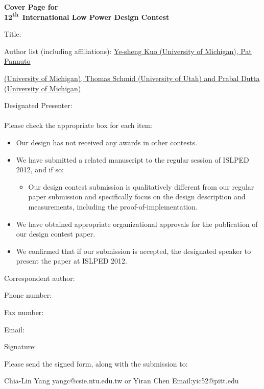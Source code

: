 \documentclass[11pt]{article}
\begin{document}
\begin{center}
\LARGE{\bf Cover Page for \\
12$^{\mbox{\small th}}$ International Low Power Design Contest}
\end{center}
Title: \underline{}\hrulefill\\\parbox{\columnwidth}{\hrulefill}

Author list (including affiliations): \underline{Ye-sheng Kuo (University of Michigan), Pat Pannuto}
\hrulefill\\\parbox{\columnwidth}{\underline{(University of Michigan), Thomas Schmid (University of Utah)
and Prabal Dutta (University of Michigan)}\hrulefill}

\singlespacing
Designated Presenter: \underline{}\hrulefill\\
~\\

Please check the appropriate box for each item:
\begin{itemize}
\item	Our design has not received any awards in other contests.

\item	We have submitted a related manuscript to the regular session of
ISLPED 2012, and if so:
	\begin{itemize}
	\item	Our design contest submission is qualitatively different from our
regular paper submission and specifically focus on the design description
and measurements, including the proof-of-implementation.
	\end{itemize}

\item	We have obtained appropriate organizational approvals for the
publication of our design contest paper. 

\item	We confirmed that if our submission is accepted, the designated
speaker to present the paper at ISLPED 2012.
\end{itemize}

\doublespacing

Correspondent author: \underline{}\hrulefill

Phone number: \underline{}\hrulefill

Fax number: \underline{}\hrulefill

Email: \underline{}\hrulefill

Signature: \underline{}\hrulefill

Please send the signed form, along with the submission to: 

Chia-Lin Yang yangc@csie.ntu.edu.tw or Yiran Chen Email:yic52@pitt.edu 
\end{document}
